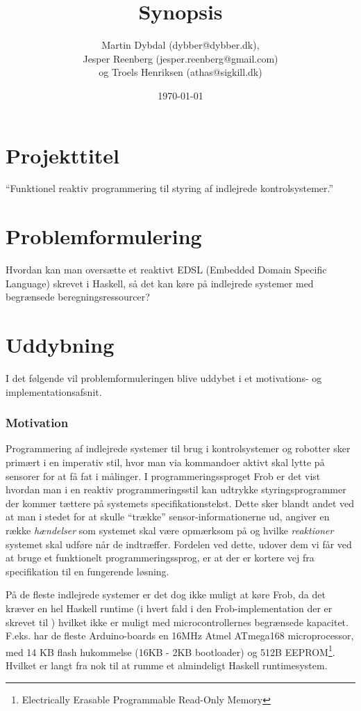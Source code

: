 \documentclass[a4paper,oneside, draft]{memoir}
\title{Synopsis}
\author{Martin Dybdal (dybber@dybber.dk), \\
Jesper Reenberg (jesper.reenberg@gmail.com) \\ og
Troels Henriksen (athas@sigkill.dk)}
\date{\today}
\newcommand{\EDSL}{EDSL (Embedded Domain Specific Language) \renewcommand{\EDSL}{ EDSL }}
\begin{document}
\maketitle

\section{Projekttitel}
"`Funktionel reaktiv programmering til styring af indlejrede
kontrolsystemer."'

\section{Problemformulering}
Hvordan kan man oversætte et reaktivt \EDSL skrevet i Haskell, så det
kan køre på indlejrede systemer med begrænsede beregningsressourcer?

\section{Uddybning}

I det følgende vil problemformuleringen blive uddybet i et motivations- og
implementationsafsnit.

\subsubsection{Motivation}
Programmering af indlejrede systemer til brug i kontrolsystemer og
robotter sker primært i en imperativ stil, hvor man via kommandoer
aktivt skal lytte på sensorer for at få fat i målinger. I
programmeringssproget Frob\cite{frob99} er det vist hvordan man i en
reaktiv programmeringsstil kan udtrykke styringsprogrammer der kommer
tættere på systemets specifikationstekst. Dette sker blandt andet ved
at man i stedet for at skulle "`trække"' sensor-informationerne ud,
angiver en række \textit{hændelser} som systemet skal være opmærksom
på og hvilke \textit{reaktioner} systemet skal udføre når de
indtræffer. Fordelen ved dette, udover dem vi får ved at bruge et
funktionelt programmeringssprog, er at der er kortere vej fra
specifikation til en fungerende løsning.

På de fleste indlejrede systemer er det dog ikke muligt at køre Frob, da det
kræver en hel Haskell runtime (i hvert fald i den Frob-implementation der er
skrevet til \cite{frob99}) hvilket ikke er muligt med microcontrollernes
begrænsede kapacitet.  F.eks. har de fleste Arduino-boards \cite{arduino} en
16MHz Atmel ATmega168 microprocessor, med 14 KB flash hukommelse (16KB - 2KB
bootloader) og 512B EEPROM\footnote{Electrically Erasable Programmable Read-Only
  Memory}. Hvilket er langt fra nok til at rumme et almindeligt Haskell
runtimesystem.
\end{document}
